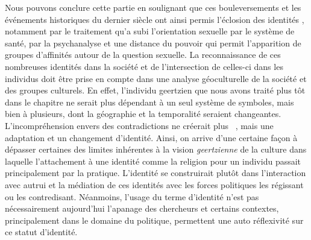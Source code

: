 Nous pouvons conclure cette partie en soulignant que ces bouleversements et les événements historiques du dernier siècle ont ainsi permis l'éclosion des identités \lgbt{}, notamment par le traitement qu'a subi l'orientation sexuelle par le système de santé, par la psychanalyse et une distance du pouvoir qui permit l'apparition de groupes d'affinités autour de la question sexuelle. 
La reconnaissance de ces nombreuses identités dans la société et de l'intersection de celles-ci dans les individus doit être prise en compte dans une analyse géoculturelle de la société et des groupes culturels.
En effet, l'individu geertzien que nous avons traité plus tôt dans le chapitre ne serait plus dépendant à un seul système de symboles, mais bien à plusieurs, dont la géographie et la temporalité seraient changeantes.
L'incompréhension envers des contradictions ne créerait plus ~\citep[33]{Geertz1972}, mais une adaptation et un changement d'identité.
Ainsi, on arrive d'une certaine façon à dépasser certaines des limites inhérentes à la vision \emph{geertzienne} de la culture dans laquelle l'attachement à une identité comme la religion pour un individu passait principalement par la pratique.
L'identité se construirait plutôt dans l'interaction avec autrui et la médiation de ces identités avec les forces politiques les régissant ou les contredisant.
Néanmoins, l'usage du terme d'identité n'est pas nécessairement aujourd'hui l'apanage des chercheurs et certains contextes, principalement dans le domaine du politique, permettent une auto réflexivité sur ce statut d'identité.

